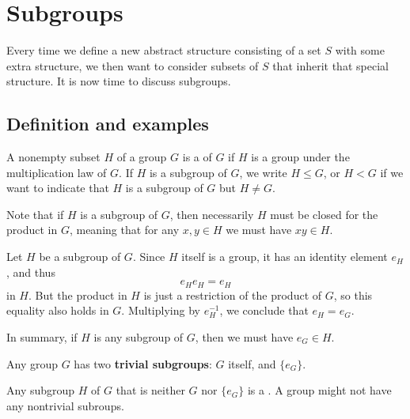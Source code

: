 










\chapter{Subgroups}


Every time we define a new abstract structure consisting of a set $S$ with some extra structure, we then want to consider subsets of $S$ that inherit that special structure. It is now time to discuss subgroups.

\section{Definition and examples}

\begin{definition}
A nonempty subset $H$ of a group $G$ is a  of $G$ if $H$ is a group under the multiplication law of $G$. If $H$ is a subgroup of $G$, we write $H \leq G$, or $H<G$ if we want to indicate that $H$ is a subgroup of $G$ but $H\neq G$.
\end{definition}


\begin{remark}
	Note that if $H$ is a subgroup of $G$, then necessarily $H$ must be closed for the product in $G$, meaning that for any $x,y \in H$ we must have $xy \in H$.
\end{remark}



\begin{remark}
	Let $H$ be a subgroup of $G$. Since $H$ itself is a group, it has an identity element $e_H$, and thus
	$$e_H e_H = e_H$$
	in $H$. But the product in $H$ is just a restriction of the product of $G$, so this equality also holds in $G$. Multiplying by $e_H^{-1}$, we conclude that $e_H = e_G$.
	
	In summary, if $H$ is any subgroup of $G$, then we must have $e_G \in H$.
\end{remark}



\begin{example}
	Any group $G$ has two {\bf trivial subgroups}: $G$ itself, and $\{ e_G \}$.
\end{example}

Any subgroup $H$ of $G$ that is neither $G$ nor $\{ e_G \}$ is a . A group might not have any nontrivial subroups.


